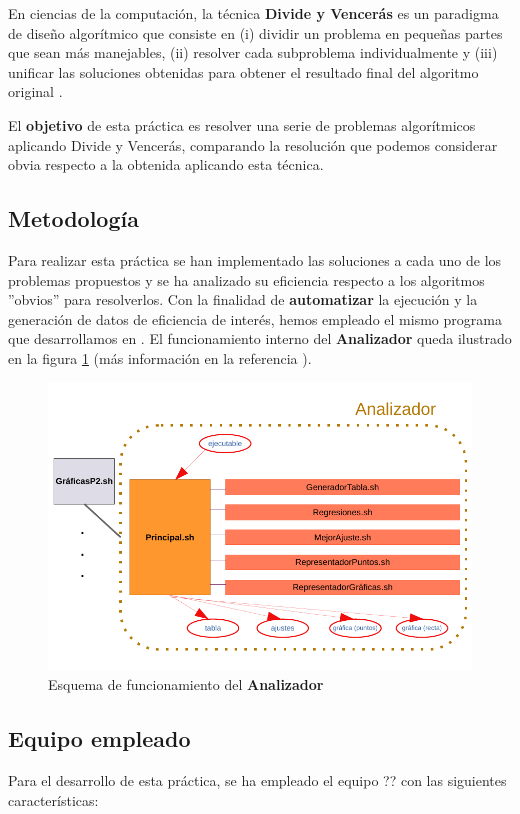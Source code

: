En ciencias de la computación, la técnica \textbf{Divide y Vencerás} es un paradigma de diseño
algorítmico que consiste en (i) dividir un problema en pequeñas partes que sean más manejables,
(ii) resolver cada subproblema individualmente y (iii) unificar las soluciones obtenidas 
para obtener el resultado final del algoritmo original \cite{Cormen2017}. 

El \textbf{objetivo} de esta práctica es resolver una serie de problemas algorítmicos aplicando
Divide y Vencerás, comparando la resolución que podemos considerar obvia respecto a la obtenida 
aplicando esta técnica. 

\subsection{Metodología}

Para realizar esta práctica se han implementado las soluciones a cada uno de los problemas
propuestos y se ha analizado su eficiencia respecto a los algoritmos ''obvios'' para resolverlos.
Con la finalidad de \textbf{automatizar} la ejecución y la generación de datos de eficiencia
de interés, hemos empleado el mismo programa que desarrollamos en \cite{Rojo2022}.
El funcionamiento interno del \textbf{Analizador} queda ilustrado en la figura 
\ref{fig:analizador} (más información en la referencia \cite{Rojo2022}). 

\begin{figure}[h]
    \centering
    \includegraphics[scale=0.67]{img/esquema_graphkiller.pdf}
    \caption{Esquema de funcionamiento del \textbf{Analizador} \cite{Rojo2022}}
    \label{fig:analizador}
\end{figure}

\subsection{Equipo empleado}

Para el desarrollo de esta práctica, se ha empleado el equipo ?? con las siguientes características: %